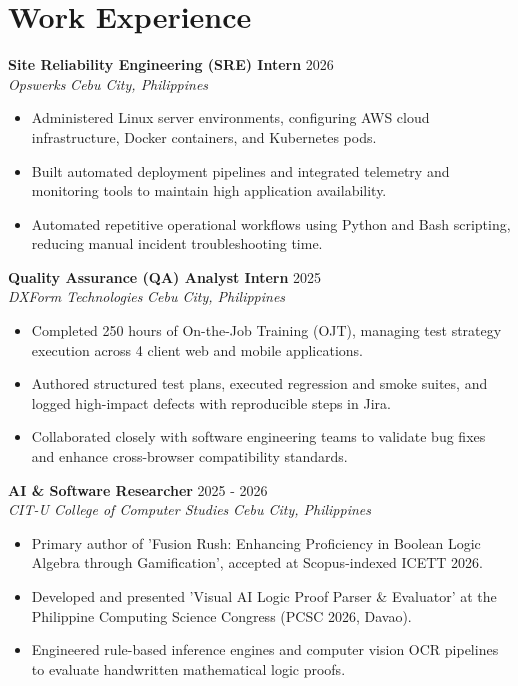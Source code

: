 \documentclass[letterpaper,10pt]{article}
\begin{document}
\section{Work Experience}
\textbf{Site Reliability Engineering (SRE) Intern} \hfill 2026
\\ \textit{Opswerks} \hfill \textit{Cebu City, Philippines}
\begin{itemize}
  \item Administered Linux server environments, configuring AWS cloud infrastructure, Docker containers, and Kubernetes pods.
  \item Built automated deployment pipelines and integrated telemetry and monitoring tools to maintain high application availability.
  \item Automated repetitive operational workflows using Python and Bash scripting, reducing manual incident troubleshooting time.
\end{itemize}
\vspace{4pt}
\textbf{Quality Assurance (QA) Analyst Intern} \hfill 2025
\\ \textit{DXForm Technologies} \hfill \textit{Cebu City, Philippines}
\begin{itemize}
  \item Completed 250 hours of On-the-Job Training (OJT), managing test strategy execution across 4 client web and mobile applications.
  \item Authored structured test plans, executed regression and smoke suites, and logged high-impact defects with reproducible steps in Jira.
  \item Collaborated closely with software engineering teams to validate bug fixes and enhance cross-browser compatibility standards.
\end{itemize}
\vspace{4pt}
\textbf{AI \& Software Researcher} \hfill 2025 - 2026
\\ \textit{CIT-U College of Computer Studies} \hfill \textit{Cebu City, Philippines}
\begin{itemize}
  \item Primary author of 'Fusion Rush: Enhancing Proficiency in Boolean Logic Algebra through Gamification', accepted at Scopus-indexed ICETT 2026.
  \item Developed and presented 'Visual AI Logic Proof Parser \& Evaluator' at the Philippine Computing Science Congress (PCSC 2026, Davao).
  \item Engineered rule-based inference engines and computer vision OCR pipelines to evaluate handwritten mathematical logic proofs.
\end{itemize}
\vspace{4pt}
\end{document}
